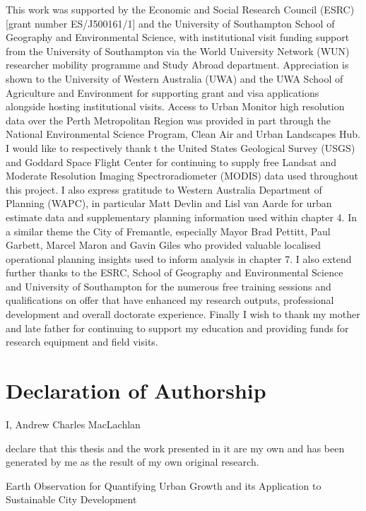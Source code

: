 \documentclass[]{book}
\begin{document}
This work was supported by the Economic and Social Research Council
(ESRC) {[}grant number ES/J500161/1{]} and the University of Southampton
School of Geography and Environmental Science, with institutional visit
funding support from the University of Southampton via the World
University Network (WUN) researcher mobility programme and Study Abroad
department. Appreciation is shown to the University of Western Australia
(UWA) and the UWA School of Agriculture and Environment for supporting
grant and visa applications alongside hosting institutional visits.
Access to Urban Monitor high resolution data over the Perth Metropolitan
Region was provided in part through the National Environmental Science
Program, Clean Air and Urban Landscapes Hub. I would like to
respectively thank t the United States Geological Survey (USGS) and
Goddard Space Flight Center for continuing to supply free Landsat and
Moderate Resolution Imaging Spectroradiometer (MODIS) data used
throughout this project. I also express gratitude to Western Australia
Department of Planning (WAPC), in particular Matt Devlin and Lisl van
Aarde for urban estimate data and supplementary planning information
used within chapter 4. In a similar theme the City of Fremantle,
especially Mayor Brad Pettitt, Paul Garbett, Marcel Maron and Gavin
Giles who provided valuable localised operational planning insights used
to inform analysis in chapter 7. I also extend further thanks to the
ESRC, School of Geography and Environmental Science and University of
Southampton for the numerous free training sessions and qualifications
on offer that have enhanced my research outputs, professional
development and overall doctorate experience. Finally I wish to thank my
mother and late father for continuing to support my education and
providing funds for research equipment and field visits.

\chapter*{Declaration of Authorship}\label{declaration-of-authorship}

I, Andrew Charles MacLachlan

declare that this thesis and the work presented in it are my own and has
been generated by me as the result of my own original research.

Earth Observation for Quantifying Urban Growth and its Application to
Sustainable City Development
\end{document}
